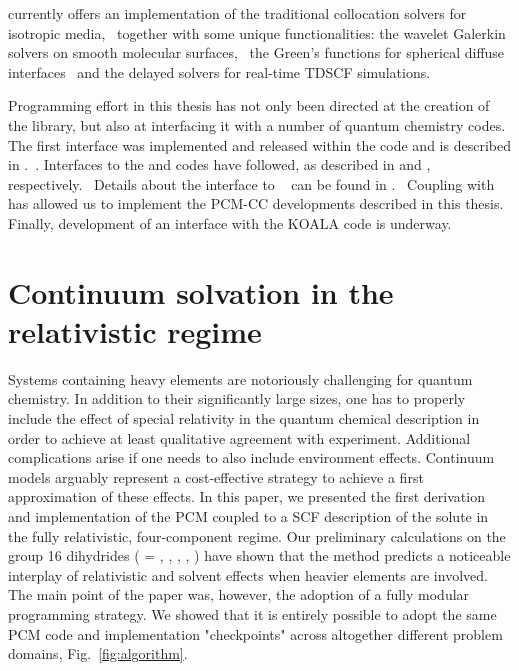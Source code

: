 \pcmsolver currently offers an implementation of the traditional collocation
solvers for isotropic media,~\autocite{Tomasi2005-vm}
together with some unique functionalities: the wavelet Galerkin solvers on smooth
molecular surfaces,~\autocite{Weijo2010-hy, Bugeanu2015-tp} the Green’s
functions for spherical diffuse interfaces~\autocite{DiRemigio2016-nn} and
the delayed solvers for real-time \acrlong*{TDSCF}
simulations.~\autocite{Corni2015-pe}

Programming effort in this thesis has not only been directed at the
creation of the \pcmsolver library, but also at interfacing it with a
number of quantum chemistry codes.
The first interface was implemented and released within the \DIRAC code
and is described in .~\autocite{DIRAC15, DiRemigio2015-ou}.
Interfaces to the \LSDALTON\autocite{LSDALTON16, Aidas2013-rp} and
\DALTON\autocite{LSDALTON16, Aidas2013-rp} codes have followed, as
described in  and , respectively.~\autocite{Bugeanu2015-tp, pcm-openrsp}
Details about the interface to \ReSpect~\autocite{ReSpect-3.5.0} can be
found in .~\autocite{pcm-respect}
Coupling with \psicode~\autocite{Turney2012-de} has allowed us to implement the
\acrshort{PCM}-\acrshort{CC} developments described in this thesis.
Finally, development of an interface with the KOALA code is underway.~\autocite{Hofener2014-ex, Hofener2016-qz}

\section{Continuum solvation in the relativistic regime}\label{sec:relapcm}

Systems containing heavy elements are notoriously challenging for quantum chemistry.
In addition to their significantly large sizes, one has to properly include the
effect of special relativity in the quantum chemical description in order to
achieve at least qualitative agreement with experiment.
Additional complications arise if one needs to also include environment effects.
Continuum models arguably represent a cost-effective strategy to achieve a first
approximation of these effects.
In this paper, we presented the first derivation and implementation of the \acrshort{PCM}
coupled to a \acrshort{SCF} description of the solute in the fully relativistic, four-component
regime.
Our preliminary calculations on the group 16 dihydrides  ( =
, , , , ) have shown that the method predicts
a noticeable interplay of relativistic and solvent effects when heavier
elements are involved.
The main point of the paper was, however, the adoption of a fully modular
programming strategy. We showed that it is entirely possible to adopt the same
\acrshort{PCM} code and implementation "checkpoints" across altogether different
problem domains, Fig.~\ref{fig:algorithm}.

